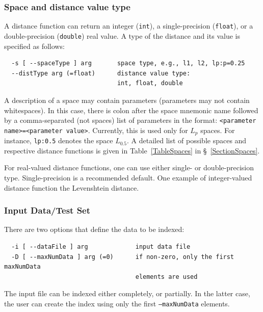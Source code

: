 \documentclass[runningheads,a4paper]{llncs}
\newcommand{\ttt}[1]{\texttt{#1}}
\begin{document}
{\subsubsection{Space and distance value type}

A distance function can return an integer (\ttt{int}), a single-precision (\ttt{float}),
or a double-precision (\ttt{double}) real value.
A type of the distance and its value is specified as follows:

\begin{verbatim}
  -s [ --spaceType ] arg       space type, e.g., l1, l2, lp:p=0.25
  --distType arg (=float)      distance value type: 
                               int, float, double
\end{verbatim}

A description of a space may contain parameters (parameters may not contain whitespaces).
In this case, there is colon after the space mnemonic name followed by a
comma-separated (not spaces) list of parameters in the format:
\ttt{<parameter name>=<parameter value>}.
Currently, this is used only for $L_p$ spaces. For instance,
 \ttt{lp:0.5} denotes the space $L_{0.5}$.
A detailed list of possible spaces and respective
distance functions is given in Table~\ref{TableSpaces} in \S~\ref{SectionSpaces}.

For real-valued distance functions, one can use either single- or double-precision
type. Single-precision is a recommended default.
One example of integer-valued distance function the Levenshtein distance.

\subsubsection{Input Data/Test Set}
There are two options that define the data to be indexed:
\begin{verbatim}
  -i [ --dataFile ] arg             input data file
  -D [ --maxNumData ] arg (=0)      if non-zero, only the first maxNumData 
                                    elements are used
\end{verbatim}
The input file can be indexed either completely, or partially.
In the latter case, the user can create the index using only
the first \ttt{--maxNumData} elements.

}
\end{document}
